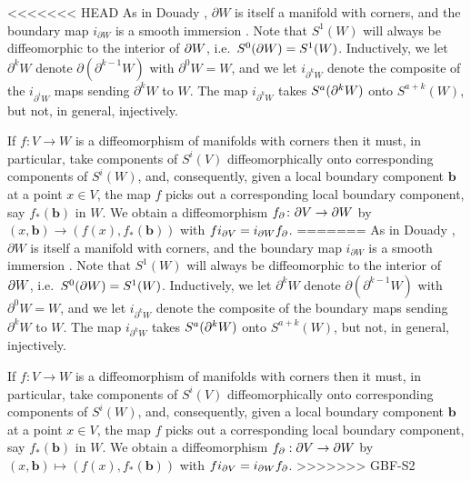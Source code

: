 <<<<<<< HEAD
As in Douady \cite{Doua61}, $\partial W$ is itself a manifold with corners, and the boundary map $i_{\partial W}$ is a smooth immersion \cite[Theorem 3.4]{Joy12}.
Note that $S^1(W)$ will always be diffeomorphic to the interior of $\partial W$, i.e.\ $S^0(\partial W)=S^1(W)$.
Inductively, we let $\partial^k W$ denote $\partial (\partial^{k-1} W)$ with $\partial^0 W = W$, and we let $i_{\partial^k W}$ denote the composite of the $i_{\partial^i W}$
maps sending $\partial^k W$ to $W$.
The map $i_{\partial^k W}$ takes $S^a(\partial^k W)$ onto $S^{a+k}(W)$, but not, in general, injectively.

\begin{remark}\label{R: bd diff}
	If $f \colon V\to W$ is a diffeomorphism of manifolds with corners then it must, in particular, take components of $S^i(V)$ diffeomorphically onto corresponding components of $S^i(W)$, and, consequently, given a local boundary component $\mathbf{b}$ at a point $x\in V$, the map $f$ picks out a corresponding local boundary component, say $f_*(\mathbf{b})$ in $W$.
	We obtain a diffeomorphism $f_\partial \colon \partial V\to \partial W$ by $(x,\mathbf{b}) \to (f(x),f_*(\mathbf{b}))$
	with $fi_{\partial V}= i_{\partial W} f_\partial$.
=======
As in Douady \cite{Doua61}, $\partial W$ is itself a manifold with corners, and the boundary map $i_{\partial W}$ is a smooth immersion \cite[Theorem 3.4]{Joy12}. Note that $S^1(W)$ will always be diffeomorphic to the interior of $\partial W$, i.e.\ $S^0(\partial W)=S^1(W)$.
Inductively, we let $\partial^k W$ denote $\partial (\partial^{k-1} W)$ with $\partial^0 W = W$, and we let $i_{\partial^k W}$ denote the composite of the boundary maps sending $\partial^k W$ to $W$. The map $i_{\partial^k W}$ takes $S^a(\partial^k W)$ onto $S^{a+k}(W)$, but not, in general, injectively.

\begin{remark}\label{R: bd diff}
If $f:V\to W$ is a diffeomorphism of manifolds with corners then it must, in particular, take components of $S^i(V)$ diffeomorphically onto corresponding components of $S^i(W)$, and, consequently, given a local boundary component $\mathbf{b}$ at a point $x\in V$, the map $f$ picks out a corresponding local boundary component, say $f_*(\mathbf{b})$ in $W$. We obtain a diffeomorphism $f_\partial:\partial V\to \partial W$ by $(x,\mathbf{b})\mapsto (f(x),f_*(\mathbf{b}))$ with $fi_{\partial V}= i_{\partial W} f_\partial$.
>>>>>>> GBF-S2
\end{remark}


\end{remark}
